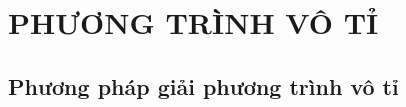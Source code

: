 \part{PHƯƠNG TRÌNH VÔ TỈ}%
\minitoc %

\thispagestyle{empty}


\chapter{Phương pháp giải phương trình vô tỉ}
    







